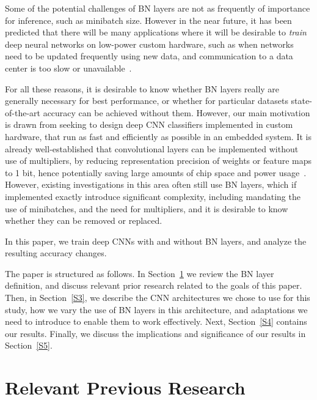 \documentclass[conference]{IEEEtran}
\begin{document}
Some of the potential challenges of BN layers are not as frequently of importance for inference, such as minibatch size. However in the near future, it has been predicted that there will be many  applications where it will be desirable to {\em train} deep neural networks on low-power custom hardware, such as when networks need to be updated frequently using new data, and communication to a data center is too slow or unavailable~\cite{Iandola.16}.
  
For all these reasons, it is desirable to know whether BN layers really are generally necessary for best performance, or whether for particular datasets state-of-the-art accuracy can be achieved without them. However, our main motivation is drawn from seeking to design deep CNN classifiers implemented in custom hardware, that run as fast and efficiently as possible in an embedded system. It is already well-established that convolutional layers can be implemented without use of multipliers, by reducing representation precision of weights or feature maps to 1 bit, hence potentially saving large amounts of chip space and power usage~\cite{Courbariaux.15,Merolla.16,Iandola.16,Rastegari.16,McDonnell.18}. However,  existing investigations in this area often still use BN layers, which if implemented exactly introduce significant complexity, including mandating the use of minibatches, and the need for multipliers, and it is desirable to know whether they can be removed or replaced.
 

 
In this paper, we train deep CNNs with and without BN layers, and analyze the resulting accuracy changes.

The paper is structured as follows. In Section~\ref{S2} we review the BN layer definition, and discuss relevant prior research related to the goals of this paper. Then, in Section~\ref{S3}, we describe the CNN architectures  we chose to use for this study, how we vary the use of BN layers in this architecture, and adaptations we need to introduce to enable them to work effectively. Next, Section~\ref{S4} contains our results. Finally, we discuss the implications and significance of our results in Section~\ref{S5}.





\section{Relevant Previous Research}\label{S2}
\end{document}
